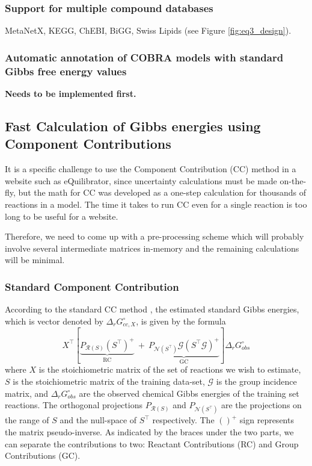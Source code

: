 \documentclass[twocolumn]{article}
\newcommand{\Gmat}{\mathcal{G}}
\newcommand{\PRmat}[1]{P_{\mathcal{R}\left(#1\right)}}
\newcommand{\PNmat}[1]{P_{\mathcal{N}\left(#1\right)}}
\begin{document}
\subsubsection{Support for multiple compound databases}
MetaNetX, KEGG, ChEBI, BiGG, Swiss Lipids (see Figure \ref{fig:eq3_design}).

\subsubsection{Automatic annotation of COBRA models with standard Gibbs free energy values}
\textbf{Needs to be implemented first.}

\subsection{Fast Calculation of Gibbs energies using Component Contributions}\label{sec:on_the_fly}

It is a specific challenge to use the Component Contribution (CC) method in a website such as eQuilibrator, since uncertainty calculations must be made on-the-fly, but the math for CC was developed as a one-step calculation for thousands of reactions in a model. The time it takes to run CC even for a single reaction is too long to be useful for a website.

Therefore, we need to come up with a pre-processing scheme which will probably involve several intermediate matrices in-memory and the remaining calculations will be minimal.

\subsubsection{Standard Component Contribution}\label{sec:standard_cc}
According to the standard CC method \cite{noor_consistent_2013}, the estimated standard Gibbs energies, which is vector denoted by $\Delta_{r}G_{cc,X}^{\circ}$, is given by the formula
\[
X^{\top} \left[ 
\underbrace{\PRmat{S} \left(S^{\top}\right)^{+}}_\textrm{RC} ~+~ 
\underbrace{\PNmat{S^\top} \Gmat \left(S^{\top}\Gmat\right)^{+}}_\textrm{GC}
\right] \Delta_{r}G_{obs}^{\circ}
\]
where $X$ is the stoichiometric matrix of the set of reactions we wish to estimate, $S$ is the stoichiometric matrix of the training data-set, $\Gmat$ is the group incidence matrix, and $\Delta_{r}G_{obs}^{\circ}$ are the observed chemical Gibbs energies of the training set reactions. The orthogonal projections $P_{\mathcal{R}\left(S\right)}$ and $P_{\mathcal{N}(S^{\top})}$ are the projections on the range of $S$ and the null-space of $S^\top$ respectively. The $()^{+}$ sign represents the matrix pseudo-inverse. As indicated by the braces under the two parts, we can separate the contributions to two: Reactant Contributions (RC) and Group Contributions (GC).
\end{document}
